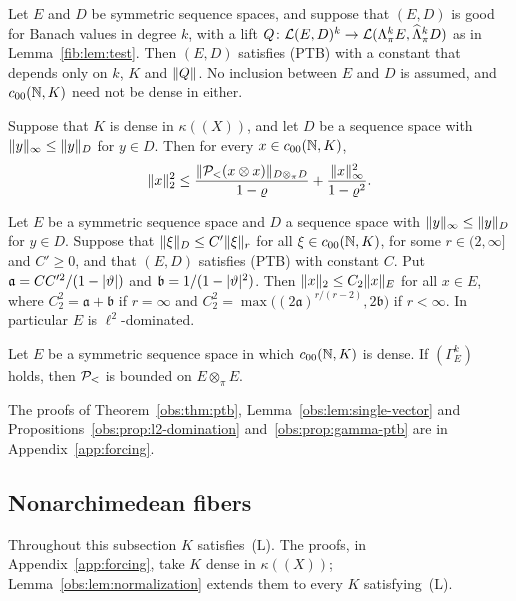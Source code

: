 \begin{theorem}\label{obs:thm:ptb}
Let $E$ and $D$ be symmetric sequence spaces, and suppose that $(E,D)$ is good for Banach values in degree $k$, with a
lift $Q\colon\mathcal L(E,D)^k\to\mathcal L(\Lambda^k_\pi E,\widehat\Lambda^k_\pi D)$ as in Lemma~\ref{fib:lem:test}. Then $(E,D)$
satisfies \textup{(PTB)} with a constant that depends only on $k$, $K$ and $\lVert Q\rVert$. No inclusion between $E$ and $D$ is
assumed, and $c_{00}(\mathbb N,K)$ need not be dense in either.
\end{theorem}

\begin{lemma}\label{obs:lem:single-vector}
Suppose that $K$ is dense in $\kappa((X))$, and let $D$ be a sequence space with $\lVert y\rVert_\infty\le\lVert y\rVert_D$ for
$y\in D$. Then for every $x\in c_{00}(\mathbb N,K)$,
\[
 \lVert x\rVert_2^2\le\frac{\lVert \mathcal P_<(x\otimes x)\rVert_{D\otimes_\pi D}}{1-\varrho}+\frac{\lVert x\rVert_\infty^2}{1-\varrho^2}.
\]
\end{lemma}

\begin{proposition}\label{obs:prop:l2-domination}
Let $E$ be a symmetric sequence space and $D$ a sequence space with $\lVert y\rVert_\infty\le\lVert y\rVert_D$ for $y\in D$. Suppose
that $\lVert \xi\rVert_D\le C'\lVert \xi\rVert_r$ for all $\xi\in c_{00}(\mathbb N,K)$, for some $r\in(2,\infty]$ and $C'\ge0$, and that $(E,D)$
satisfies \textup{(PTB)} with constant $C$. Put $\mathfrak a=CC'^2/(1-\lvert \vartheta\rvert)$ and
$\mathfrak b=1/(1-\lvert \vartheta\rvert^2)$. Then $\lVert x\rVert_2\le C_2\lVert x\rVert_E$ for all $x\in E$, where $C_2^2=\mathfrak a+\mathfrak b$
if $r=\infty$ and $C_2^2=\max\bigl((2\mathfrak a)^{r/(r-2)},2\mathfrak b\bigr)$ if $r<\infty$. In particular $E$ is
$\ell^2$\nobreakdash-dominated.
\end{proposition}

\begin{proposition}\label{obs:prop:gamma-ptb}
Let $E$ be a symmetric sequence space in which $c_{00}(\mathbb N,K)$ is dense. If $(\Gamma^k_E)$ holds, then $\mathcal P_<$ is bounded
on $E\otimes_\pi E$.
\end{proposition}

The proofs of Theorem~\ref{obs:thm:ptb}, Lemma~\ref{obs:lem:single-vector} and Propositions~\ref{obs:prop:l2-domination}
and~\ref{obs:prop:gamma-ptb} are in Appendix~\ref{app:forcing}.

\subsection{Nonarchimedean fibers}\label{obs:ssec:nonarch}
Throughout this subsection $K$ satisfies~\textup{(L)}. The proofs, in Appendix~\ref{app:forcing}, take $K$ dense in
$\kappa((X))$; Lemma~\ref{obs:lem:normalization} extends them to every $K$ satisfying~\textup{(L)}.

